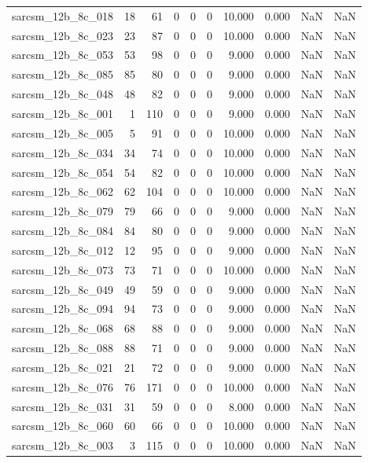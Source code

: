 \documentclass{article}
\begin{document}
\begin{longtable}{lrrrrrrrrr}
sarcsm\_12b\_8c\_018 & 18 & 61 & 0 & 0 & 0 & 10.000 & 0.000 & NaN & NaN \\
sarcsm\_12b\_8c\_023 & 23 & 87 & 0 & 0 & 0 & 10.000 & 0.000 & NaN & NaN \\
sarcsm\_12b\_8c\_053 & 53 & 98 & 0 & 0 & 0 & 9.000 & 0.000 & NaN & NaN \\
sarcsm\_12b\_8c\_085 & 85 & 80 & 0 & 0 & 0 & 9.000 & 0.000 & NaN & NaN \\
sarcsm\_12b\_8c\_048 & 48 & 82 & 0 & 0 & 0 & 9.000 & 0.000 & NaN & NaN \\
sarcsm\_12b\_8c\_001 & 1 & 110 & 0 & 0 & 0 & 9.000 & 0.000 & NaN & NaN \\
sarcsm\_12b\_8c\_005 & 5 & 91 & 0 & 0 & 0 & 10.000 & 0.000 & NaN & NaN \\
sarcsm\_12b\_8c\_034 & 34 & 74 & 0 & 0 & 0 & 10.000 & 0.000 & NaN & NaN \\
sarcsm\_12b\_8c\_054 & 54 & 82 & 0 & 0 & 0 & 10.000 & 0.000 & NaN & NaN \\
sarcsm\_12b\_8c\_062 & 62 & 104 & 0 & 0 & 0 & 10.000 & 0.000 & NaN & NaN \\
sarcsm\_12b\_8c\_079 & 79 & 66 & 0 & 0 & 0 & 9.000 & 0.000 & NaN & NaN \\
sarcsm\_12b\_8c\_084 & 84 & 80 & 0 & 0 & 0 & 9.000 & 0.000 & NaN & NaN \\
sarcsm\_12b\_8c\_012 & 12 & 95 & 0 & 0 & 0 & 9.000 & 0.000 & NaN & NaN \\
sarcsm\_12b\_8c\_073 & 73 & 71 & 0 & 0 & 0 & 10.000 & 0.000 & NaN & NaN \\
sarcsm\_12b\_8c\_049 & 49 & 59 & 0 & 0 & 0 & 9.000 & 0.000 & NaN & NaN \\
sarcsm\_12b\_8c\_094 & 94 & 73 & 0 & 0 & 0 & 9.000 & 0.000 & NaN & NaN \\
sarcsm\_12b\_8c\_068 & 68 & 88 & 0 & 0 & 0 & 9.000 & 0.000 & NaN & NaN \\
sarcsm\_12b\_8c\_088 & 88 & 71 & 0 & 0 & 0 & 9.000 & 0.000 & NaN & NaN \\
sarcsm\_12b\_8c\_021 & 21 & 72 & 0 & 0 & 0 & 9.000 & 0.000 & NaN & NaN \\
sarcsm\_12b\_8c\_076 & 76 & 171 & 0 & 0 & 0 & 10.000 & 0.000 & NaN & NaN \\
sarcsm\_12b\_8c\_031 & 31 & 59 & 0 & 0 & 0 & 8.000 & 0.000 & NaN & NaN \\
sarcsm\_12b\_8c\_060 & 60 & 66 & 0 & 0 & 0 & 10.000 & 0.000 & NaN & NaN \\
sarcsm\_12b\_8c\_003 & 3 & 115 & 0 & 0 & 0 & 10.000 & 0.000 & NaN & NaN \\

\end{longtable}
\end{document}
